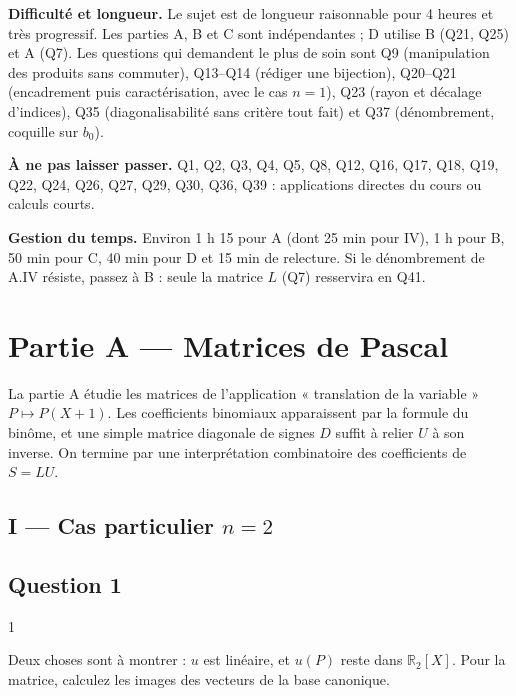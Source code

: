 \documentclass[11pt,a4paper]{article}
\begin{document}
\textbf{Difficulté et longueur.} Le sujet est de longueur raisonnable pour 4 heures et très progressif. Les parties A, B et C sont indépendantes ; D utilise B (Q21, Q25) et A (Q7). Les questions qui demandent le plus de soin sont Q9 (manipulation des produits sans commuter), Q13--Q14 (rédiger une bijection), Q20--Q21 (encadrement puis caractérisation, avec le cas \(n=1\)), Q23 (rayon et décalage d'indices), Q35 (diagonalisabilité sans critère tout fait) et Q37 (dénombrement, coquille sur \(b_0\)).

\textbf{À ne pas laisser passer.} Q1, Q2, Q3, Q4, Q5, Q8, Q12, Q16, Q17, Q18, Q19, Q22, Q24, Q26, Q27, Q29, Q30, Q36, Q39 : applications directes du cours ou calculs courts.

\textbf{Gestion du temps.} Environ 1 h 15 pour A (dont 25 min pour IV), 1 h pour B, 50 min pour C, 40 min pour D et 15 min de relecture. Si le dénombrement de A.IV résiste, passez à B : seule la matrice \(L\) (Q7) resservira en Q41.

\hypertarget{partie-a-matrices-de-pascal}{%
\section{Partie A --- Matrices de Pascal}\label{partie-a-matrices-de-pascal}}

La partie A étudie les matrices de l'application « translation de la variable » \(P\mapsto P(X+1)\). Les coefficients binomiaux apparaissent par la formule du binôme, et une simple matrice diagonale de signes \(D\) suffit à relier \(U\) à son inverse. On termine par une interprétation combinatoire des coefficients de \(S=LU\).

\hypertarget{i-cas-particulier-n2}{%
\subsection{\texorpdfstring{I --- Cas particulier \(n=2\)}{I --- Cas particulier n=2}}\label{i-cas-particulier-n2}}

\hypertarget{question-1}{%
\subsection{Question 1}\label{question-1}}

\begin{indication}{1}

Deux choses sont à montrer : \(u\) est linéaire, et \(u(P)\) reste dans \(\mathbb R_2[X]\). Pour la matrice, calculez les images des vecteurs de la base canonique.

\end{indication}
\end{document}
